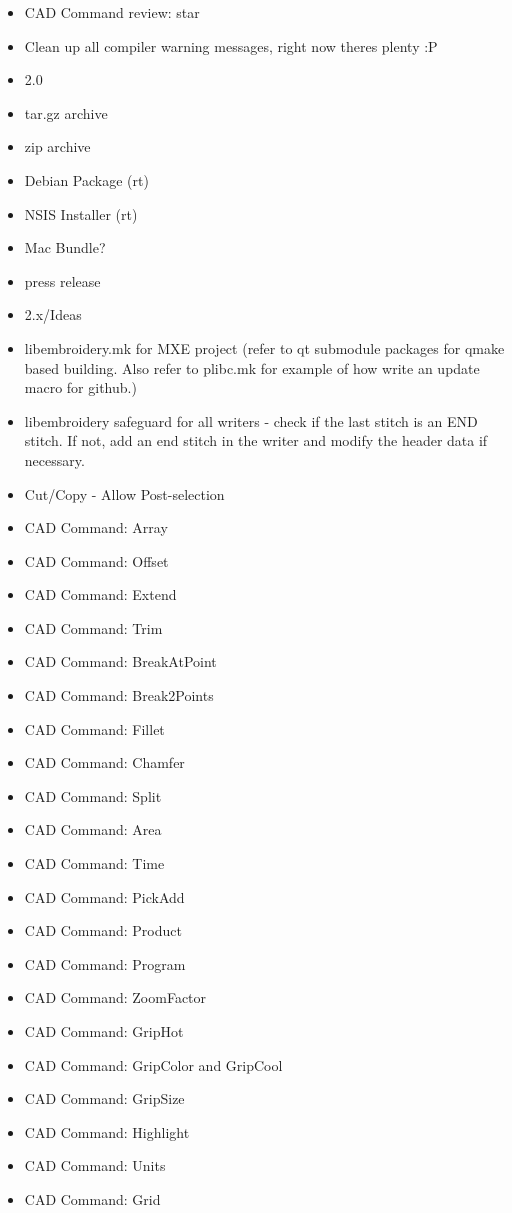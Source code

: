 \documentclass[10pt]{report}
\begin{document}
\begin{itemize}
  \item CAD Command review: star
  \item Clean up all compiler warning messages, right now theres plenty :P
\item 2.0
  \item tar.gz archive
  \item zip archive
  \item Debian Package (rt)
  \item NSIS Installer (rt)
  \item Mac Bundle?
  \item press release
\item 2.x/Ideas
  \item libembroidery.mk for MXE project (refer to qt submodule packages for qmake based building. Also refer to plibc.mk for example of how write an update macro for github.)
  \item libembroidery safeguard for all writers - check if the last stitch is an END stitch. If not, add an end stitch in the writer and modify the header data if necessary.
  \item Cut/Copy - Allow Post-selection
  \item CAD Command: Array
  \item CAD Command: Offset
  \item CAD Command: Extend
  \item CAD Command: Trim
  \item CAD Command: BreakAtPoint
  \item CAD Command: Break2Points
  \item CAD Command: Fillet
  \item CAD Command: Chamfer
  \item CAD Command: Split
  \item CAD Command: Area
  \item CAD Command: Time
  \item CAD Command: PickAdd
  \item CAD Command: Product
  \item CAD Command: Program
  \item CAD Command: ZoomFactor
  \item CAD Command: GripHot
  \item CAD Command: GripColor and GripCool
  \item CAD Command: GripSize
  \item CAD Command: Highlight
  \item CAD Command: Units
  \item CAD Command: Grid

\end{itemize}
\end{document}
